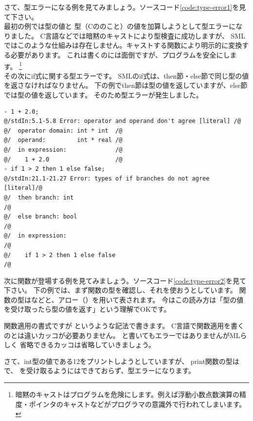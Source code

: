 \documentclass[11pt,a4paper]{jarticle}
\begin{document}
さて、型エラーになる例を見てみましょう。ソースコード\ref{code:type-error1}を見て下さい。\\
最初の例では型の値と
型（Cののこと）の値を加算しようとして型エラーになりました。
C言語などでは暗黙のキャストにより型検査に成功しますが、
SMLではこのような仕組みは存在しません。キャストする関数により明示的に変換する必要があります。
これは書くのには面倒ですが、プログラムを安全にします。
\footnote{暗黙のキャストはプログラムを危険にします。例えば浮動小数点数演算の精度・ポインタのキャストなどがプログラマの意識外で行われてしまいます。}\\
その次にif式に関する型エラーです。
SMLのif式は、then節・else節で同じ型の値を返さなければなりません。
下の例でthen節は型の値を返していますが、else節では型の値を返しています。
そのため型エラーが発生しました。

\begin{lstlisting}[label=code:type-error1,caption=型エラー１]
- 1 + 2.0;
@/stdIn:5.1-5.8 Error: operator and operand don't agree [literal] /@
@/  operator domain: int * int  /@
@/  operand:         int * real /@
@/  in expression:              /@
@/    1 + 2.0                   /@
- if 1 > 2 then 1 else false;
@/stdIn:21.1-21.27 Error: types of if branches do not agree [literal]/@
@/  then branch: int                                                 /@
@/  else branch: bool                                                /@
@/  in expression:                                                   /@
@/    if 1 > 2 then 1 else false                                     /@
\end{lstlisting}

次に関数が登場する例を見てみましょう。ソースコード\ref{code:type-error2}を見て下さい。
下の例では、まず関数の型を確認し、それを使おうとしています。
関数の型はなどと、アロー（\sml{->}）を用いて表されます。
今はこの読み方は「型の値を受け取ったら型の値を返す」という理解でOKです。

関数適用の書式ですが  というような記法で書きます。
C言語で関数適用を書くのとは違いカッコが必要ありません。
と書いてもエラーではありませんがMLらしく
省略できるカッコは省略していきましょう。

さて、int型の値である12をプリントしようとしていますが、
print関数の型はで、
を受け取るようにはできておらず、型エラーになります。
\end{document}
